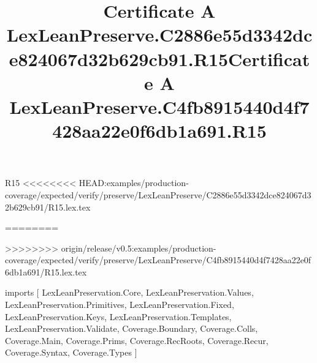 \begin{lexlean}{R15}
<<<<<<<< HEAD:examples/production-coverage/expected/verify/preserve/LexLeanPreserve/C2886e55d3342dce824067d32b629cb91/R15.lex.tex
\title{Certificate A LexLeanPreserve.C2886e55d3342dce824067d32b629cb91.R15}
========
\title{Certificate A LexLeanPreserve.C4fb8915440d4f7428aa22e0f6db1a691.R15}
>>>>>>>> origin/release/v0.5:examples/production-coverage/expected/verify/preserve/LexLeanPreserve/C4fb8915440d4f7428aa22e0f6db1a691/R15.lex.tex
\begin{coremodule}
imports [
  LexLeanPreservation.Core,
  LexLeanPreservation.Values,
  LexLeanPreservation.Primitives,
  LexLeanPreservation.Fixed,
  LexLeanPreservation.Keys,
  LexLeanPreservation.Templates,
  LexLeanPreservation.Validate,
  Coverage.Boundary,
  Coverage.Colls,
  Coverage.Main,
  Coverage.Prims,
  Coverage.RecRoots,
  Coverage.Recur,
  Coverage.Syntax,
  Coverage.Types
]


\end{coremodule}
\end{lexlean}

